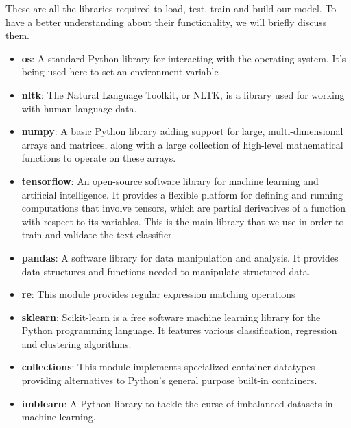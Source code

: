 These are all the libraries required to load, test, train and build our model. To have a better understanding about their functionality, we will briefly discuss them.
\begin{itemize}
	\item \textbf{os}: A standard Python library for interacting with the operating system. It's being used here to set an environment variable
	
	\item \textbf{nltk}: The Natural Language Toolkit, or NLTK, is a library used for working with human language data.
	
	\item \textbf{numpy}: A basic Python library adding support for large, multi-dimensional arrays and matrices, along with a large collection of high-level mathematical functions to operate on these arrays.
	
	\item \textbf{tensorflow}: An open-source software library for machine learning and artificial intelligence. It provides a flexible platform for defining and running computations that involve tensors, which are partial derivatives of a function with respect to its variables. This is the main library that we use in order to train and validate the text classifier.
	
	\item \textbf{pandas}: A software library for data manipulation and analysis. It provides data structures and functions needed to manipulate structured data.
	
	\item \textbf{re}: This module provides regular expression matching operations
	
	\item \textbf{sklearn}: Scikit-learn is a free software machine learning library for the Python programming language. It features various classification, regression and clustering algorithms.
	
	\item \textbf{collections}: This module implements specialized container datatypes providing alternatives to Python’s general purpose built-in containers.
	
	\item \textbf{imblearn}: A Python library to tackle the curse of imbalanced datasets in machine learning.
\end{itemize}

